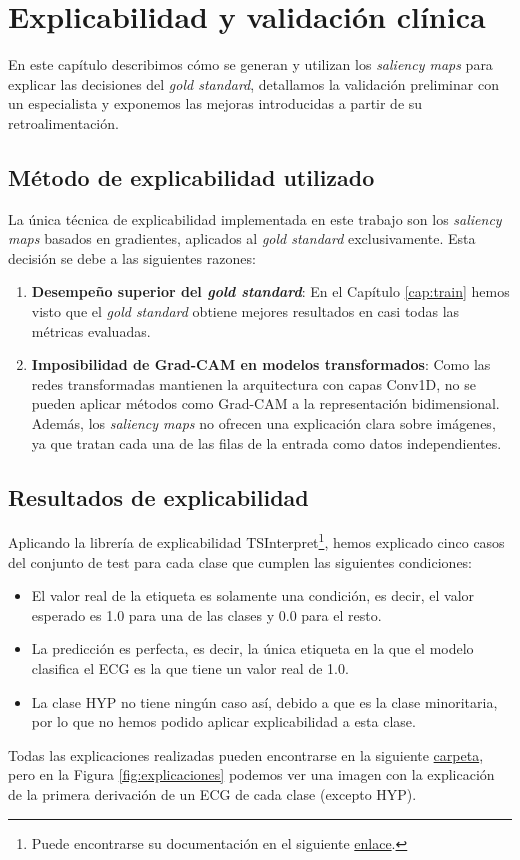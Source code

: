 \chapter{Explicabilidad y validación clínica}
\label{cap:explicabilidad}
\begin{resumen}
	En este capítulo describimos cómo se generan y utilizan los \emph{saliency maps} para explicar las decisiones del \emph{gold standard}, detallamos la validación preliminar con un especialista y exponemos las mejoras introducidas a partir de su retroalimentación.
\end{resumen}

\section{Método de explicabilidad utilizado}
La única técnica de explicabilidad implementada en este trabajo son los \emph{saliency maps} basados en gradientes, aplicados al \emph{gold standard} exclusivamente. Esta decisión se debe a las siguientes razones:

\begin{enumerate}
	\item \textbf{Desempeño superior del \emph{gold standard}}: En el Capítulo \ref{cap:train} hemos visto que el \emph{gold standard} obtiene mejores resultados en casi todas las métricas evaluadas.
	\item \textbf{Imposibilidad de Grad-CAM en modelos transformados}: Como las redes transformadas mantienen la arquitectura con capas Conv1D, no se pueden aplicar métodos como Grad-CAM a la representación bidimensional. Además, los \emph{saliency maps} no ofrecen una explicación clara sobre imágenes, ya que tratan cada una de las filas de la entrada como datos independientes.
\end{enumerate}
\section{Resultados de explicabilidad}
Aplicando la librería de explicabilidad TSInterpret\footnote{Puede encontrarse su documentación en el siguiente \href{https://fzi-forschungszentrum-informatik.github.io/TSInterpret/}{enlace}.}, hemos explicado cinco casos del conjunto de test para cada clase que cumplen las siguientes condiciones:
\begin{itemize}
	\item El valor real de la etiqueta es solamente una condición, es decir, el valor esperado es 1.0 para una de las clases y 0.0 para el resto.
	\item La predicción es perfecta, es decir, la única etiqueta en la que el modelo clasifica el ECG es la que tiene un valor real de 1.0.
	\item La clase HYP no tiene ningún caso así, debido a que es la clase minoritaria, por lo que no hemos podido aplicar explicabilidad a esta clase.
\end{itemize}
Todas las explicaciones realizadas pueden encontrarse en la siguiente \href{https://drive.google.com/drive/folders/1EOW2RsL3Ub2UQ1NiEeRpMVd9SsnQpBkf?usp=drive_link}{carpeta}, pero en la Figura \ref{fig:explicaciones} podemos ver una imagen con la explicación de la primera derivación de un ECG de cada clase (excepto HYP).

